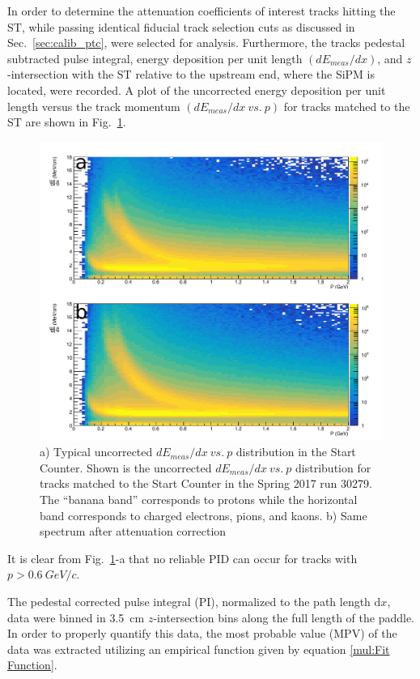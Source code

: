 In order to determine the attenuation coefficients of interest tracks hitting the ST, while passing identical fiducial track selection cuts as discussed in Sec.~\ref{sec:calib_ptc}, were selected for analysis.  Furthermore, the tracks pedestal subtracted pulse integral, energy deposition per unit length $(dE_{meas} / dx)$, and $z$-intersection with the ST relative to the upstream end, where the SiPM is located, were recorded.  A plot of the uncorrected energy deposition per unit length versus the track momentum $(dE_{meas} / dx\ vs.\ p)$ for tracks matched to the ST are shown in Fig.~\ref{fig:dEdx_vs_p_uncorr}.
	\begin{figure}[!htb]
		\centering
		\includegraphics[width=1.0\columnwidth]{calibration/figs/NIM_ATT}
		\caption{a) Typical uncorrected $dE_{meas}/dx\ vs.\ p$ distribution in the Start Counter.  Shown is the uncorrected $dE_{meas}/dx\ vs.\ p$ distribution for tracks matched to the Start Counter in the Spring 2017 run 30279. The ``banana band'' corresponds to protons while the horizontal band corresponds to charged electrons, pions, and kaons. b) Same spectrum after attenuation correction}
		\label{fig:dEdx_vs_p_uncorr}
	\end{figure}
It is clear from Fig.~\ref{fig:dEdx_vs_p_uncorr}-a that no reliable PID can occur for tracks with $p > 0.6\ GeV/c$.

The pedestal corrected pulse integral (PI), normalized to the path length $\mathrm{d}x$, data were binned in 3.5~cm $z$-intersection bins along the full length of the paddle. In order to properly quantify this data, the most probable value (MPV) of the data was extracted utilizing an empirical function given by equation \ref{mul:Fit Function}. 



